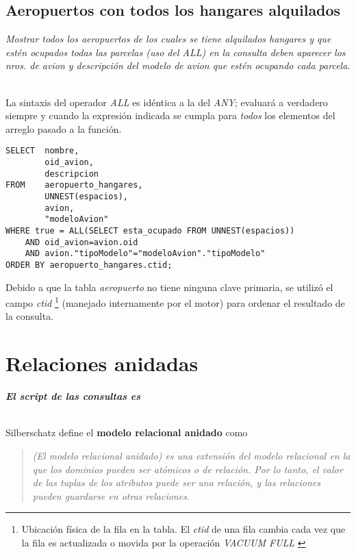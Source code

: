 \subsection{Aeropuertos con todos los hangares alquilados}

\emph{Mostrar todos los aeropuertos de los cuales se tiene alquilados hangares y que estén ocupados todas las parcelas (uso del ALL) en la consulta deben aparecer los nros. de avion y descripción del modelo de avion que estén ocupando cada parcela.} 

~\\

La sintaxis del operador \emph{ALL} es idéntica a la del \emph{ANY}; evaluará a verdadero siempre y cuando la expresión indicada se cumpla para \emph{todos} los elementos del arreglo pasado a la función.   

\clearpage

\vspace*{5mm}
\lstset{style=sql}
\begin{lstlisting}
SELECT  nombre, 
        oid_avion, 
        descripcion 
FROM    aeropuerto_hangares, 
        UNNEST(espacios), 
        avion, 
        "modeloAvion" 
WHERE true = ALL(SELECT esta_ocupado FROM UNNEST(espacios)) 
    AND oid_avion=avion.oid 
    AND avion."tipoModelo"="modeloAvion"."tipoModelo" 
ORDER BY aeropuerto_hangares.ctid;
\end{lstlisting}

Debido a que la tabla \emph{aeropuerto} no tiene ninguna clave primaria, se utilizó el campo \emph{ctid} \footnote{Ubicación física de la fila en la tabla. El \emph{ctid} de una fila cambia cada vez que la fila es actualizada o movida por la operación \emph{VACUUM FULL} \autocite{ctid}} (manejado internamente por el motor) para ordenar el resultado de la consulta. 


\section{Relaciones anidadas}
\emph{\textbf{El script de las consultas es }} 

~\\

Silberschatz define el \textbf{modelo relacional anidado} como
\begin{quote}\itshape
    (El modelo relacional anidado) es una extensión del modelo relacional en la que los dominios pueden ser atómicos o de relación. Por lo tanto, el valor de las tuplas de los atributos puede ser una relación, y las relaciones pueden guardarse en otras relaciones. \autocite{silberschatz}
\end{quote}

